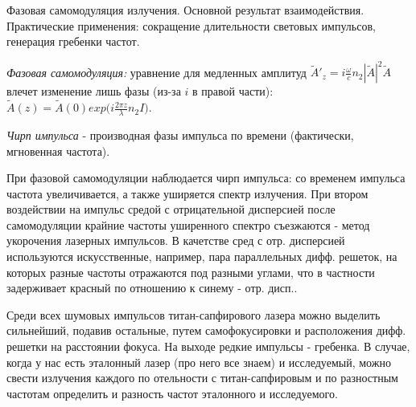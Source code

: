 
\begin{leftrules}
Фазовая самомодуляция излучения. Основной результат взаимодействия. Практические применения: сокращение длительности световых импульсов, генерация гребенки частот.
\end{leftrules}


\textit{Фазовая самомодуляция:} уравнение для медленных амплитуд $\tilde{A}'_{z}=i\frac{\omega}{c} n_{2} |\tilde{A}|^{2}\tilde{A}$ влечет изменение лишь фазы (из-за $i$ в правой части): $\tilde{A}(z)=\tilde{A}(0)exp \big(i\frac{2\pi z}{\lambda} n_{2}I \big)$.

\begin{to_def}
    \textit{Чирп импульса} - производная фазы импульса по времени (фактически, мгновенная частота).
\end{to_def}

При фазовой самомодуляции наблюдается чирп импульса: со временем импульса частота увеличивается, а также уширяется спектр излучения. При втором воздействии на импульс средой с отрицательной дисперсией после самомодуляции крайние частоты уширенного спектро съезжаются - метод укорочения лазерных импульсов. В качетстве сред с отр. дисперсией используются искусственные, например, пара параллельных дифф. решеток, на которых разные частоты отражаются под разными углами, что в частности задерживает красный по отношению к синему - отр. дисп..


Среди всех шумовых импульсов титан-сапфирового лазера можно выделить сильнейший, подавив остальные, путем самофокусировки и расположения дифф. решетки на расстоянии фокуса. На выходе редкие импульсы - гребенка. В случае, когда у нас есть эталонный лазер (про него все знаем) и исследуемый, можно свести излучения каждого по отельности с титан-сапфировым и по разностным частотам определить и разность частот эталонного и исследуемого.
